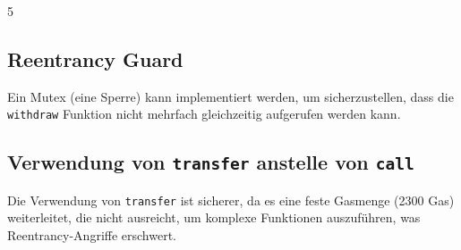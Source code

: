 \documentclass[german]{../uebung}
\begin{document}
\begin{exercise} {5}
    \subsection*{Reentrancy Guard}

    Ein Mutex (eine Sperre) kann implementiert werden, um sicherzustellen, dass die \texttt{withdraw} Funktion nicht mehrfach gleichzeitig aufgerufen werden kann.

    \subsection*{Verwendung von \texttt{transfer} anstelle von \texttt{call}}

    Die Verwendung von \texttt{transfer} ist sicherer, da es eine feste Gasmenge (2300 Gas) weiterleitet, die nicht ausreicht, um komplexe Funktionen auszuführen, was Reentrancy-Angriffe erschwert.

\end{exercise}
\end{document}
